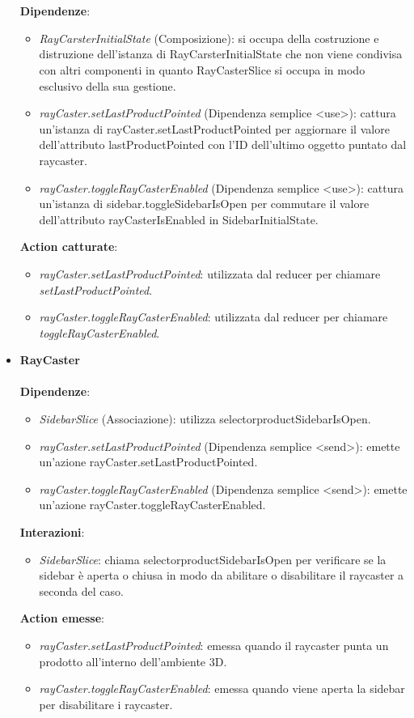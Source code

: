 \begin{itemize}
		\\\\
		\textbf{Dipendenze}:
		\begin{itemize}
			\item \textit{RayCarsterInitialState} (Composizione): si occupa della costruzione e distruzione dell'istanza di RayCarsterInitialState
			che non viene condivisa con altri componenti in quanto RayCasterSlice si occupa in modo esclusivo della sua gestione.
			\item \textit{rayCaster.setLastProductPointed} (Dipendenza semplice \textless use\textgreater): cattura un'istanza di rayCaster.setLastProductPointed
			per aggiornare il valore dell'attributo lastProductPointed con l'ID dell'ultimo oggetto puntato dal raycaster. 
			\item \textit{rayCaster.toggleRayCasterEnabled} (Dipendenza semplice \textless use\textgreater): cattura un'istanza di sidebar.toggleSidebarIsOpen
			per commutare il valore dell'attributo rayCasterIsEnabled in SidebarInitialState. 
		\end{itemize}
		\textbf{Action catturate}:
		\begin{itemize}
			\item \textit{rayCaster.setLastProductPointed}: utilizzata dal reducer per chiamare \textit{setLastProductPointed}.
			\item \textit{rayCaster.toggleRayCasterEnabled}: utilizzata dal reducer per chiamare \textit{toggleRayCasterEnabled}.
		\end{itemize}
		\item \textbf{RayCaster}
		\\\\
		\textbf{Dipendenze}:
		\begin{itemize}
			\item \textit{SidebarSlice} (Associazione): utilizza selectorproductSidebarIsOpen.
			\item \textit{rayCaster.setLastProductPointed} (Dipendenza semplice \textless send\textgreater): emette un'azione
			rayCaster.setLastProductPointed.
			\item \textit{rayCaster.toggleRayCasterEnabled} (Dipendenza semplice \textless send\textgreater): emette un'azione
			rayCaster.toggleRayCasterEnabled.
		\end{itemize}
		\textbf{Interazioni}:
		\begin{itemize}
			\item \textit{SidebarSlice}: chiama selectorproductSidebarIsOpen per verificare se la sidebar
			è aperta o chiusa in modo da abilitare o disabilitare il raycaster a seconda del caso.
		\end{itemize}
		\textbf{Action emesse}:
		\begin{itemize}
			\item \textit{rayCaster.setLastProductPointed}: emessa quando il raycaster punta un prodotto all'interno dell'ambiente 3D.
			\item \textit{rayCaster.toggleRayCasterEnabled}: emessa quando viene aperta la sidebar per disabilitare i raycaster.
		\end{itemize}
\end{itemize}


